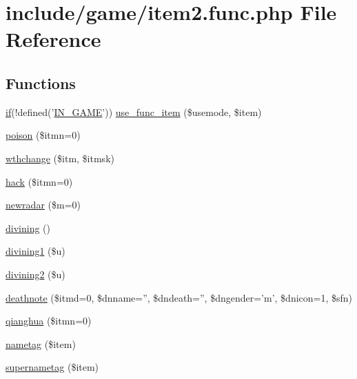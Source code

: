 \hypertarget{item2_8func_8php}{\section{include/game/item2.func.\+php File Reference}
\label{item2_8func_8php}
}
\subsection*{Functions}
\begin{DoxyCompactItemize}
\item 
\hyperlink{login__old_8php_a4ac1118c2e44c513a674bc1793ba6c90}{if}(!defined('\hyperlink{templates_2install_8php_a12c82f3d28569a3f80804f1e72cef14c}{I\+N\+\_\+\+G\+A\+M\+E}')) \hyperlink{item2_8func_8php_ab68720cc4381c2977750fed634bb39cc}{use\+\_\+func\+\_\+item} (\$usemode, \$item)
\item 
\hyperlink{item2_8func_8php_a9a3479eed15bfdbe85b6e5f78f5e2e40}{poison} (\$itmn=0)
\item 
\hyperlink{item2_8func_8php_aace63fc9b888e03d50785cb1235c9816}{wthchange} (\$itm, \$itmsk)
\item 
\hyperlink{item2_8func_8php_a175c54d1456f4301cffabb23e5606bb8}{hack} (\$itmn=0)
\item 
\hyperlink{item2_8func_8php_af0035518d546fd432434aa3bf097c056}{newradar} (\$m=0)
\item 
\hyperlink{item2_8func_8php_a96bbb5a14e141fa0877e186a23820052}{divining} ()
\item 
\hyperlink{item2_8func_8php_a430020cb3140a3406bc2c209f4aa2662}{divining1} (\$u)
\item 
\hyperlink{item2_8func_8php_a43e29f54f610b0afe7dd5f899a993d03}{divining2} (\$u)
\item 
\hyperlink{item2_8func_8php_a60d45f8e14dc812e3b8bd3b1a6f5e2a2}{deathnote} (\$itmd=0, \$dnname='', \$dndeath='', \$dngender='m', \$dnicon=1, \$sfn)
\item 
\hyperlink{item2_8func_8php_af030dfb5980f0b617e994d5143422e4d}{qianghua} (\$itmn=0)
\item 
\hyperlink{item2_8func_8php_a91332eb712b7ec5269b5ebbcebbc01dc}{nametag} (\$item)
\item 
\hyperlink{item2_8func_8php_ae7880132d231ee8dbd260319a98758ff}{supernametag} (\$item)
\end{DoxyCompactItemize}



